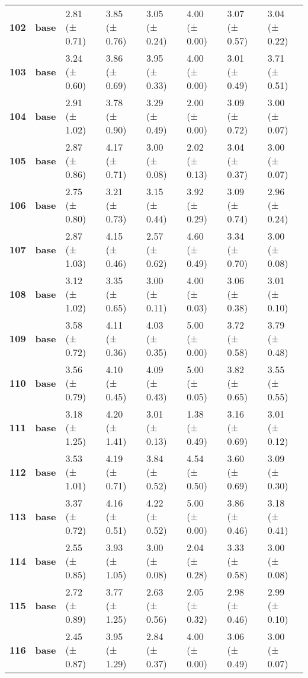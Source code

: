 \begin{longtable}{llllllll}
\cline{1-8}
\textbf{102} & \textbf{base} & 2.81 (± 0.71) & 3.85 (± 0.76) & 3.05 (± 0.24) & 4.00 (± 0.00) & 3.07 (± 0.57) & 3.04 (± 0.22) \\
\cline{1-8}
\textbf{103} & \textbf{base} & 3.24 (± 0.60) & 3.86 (± 0.69) & 3.95 (± 0.33) & 4.00 (± 0.00) & 3.01 (± 0.49) & 3.71 (± 0.51) \\
\cline{1-8}
\textbf{104} & \textbf{base} & 2.91 (± 1.02) & 3.78 (± 0.90) & 3.29 (± 0.49) & 2.00 (± 0.00) & 3.09 (± 0.72) & 3.00 (± 0.07) \\
\cline{1-8}
\textbf{105} & \textbf{base} & 2.87 (± 0.86) & 4.17 (± 0.71) & 3.00 (± 0.08) & 2.02 (± 0.13) & 3.04 (± 0.37) & 3.00 (± 0.07) \\
\cline{1-8}
\textbf{106} & \textbf{base} & 2.75 (± 0.80) & 3.21 (± 0.73) & 3.15 (± 0.44) & 3.92 (± 0.29) & 3.09 (± 0.74) & 2.96 (± 0.24) \\
\cline{1-8}
\textbf{107} & \textbf{base} & 2.87 (± 1.03) & 4.15 (± 0.46) & 2.57 (± 0.62) & 4.60 (± 0.49) & 3.34 (± 0.70) & 3.00 (± 0.08) \\
\cline{1-8}
\textbf{108} & \textbf{base} & 3.12 (± 1.02) & 3.35 (± 0.65) & 3.00 (± 0.11) & 4.00 (± 0.03) & 3.06 (± 0.38) & 3.01 (± 0.10) \\
\cline{1-8}
\textbf{109} & \textbf{base} & 3.58 (± 0.72) & 4.11 (± 0.36) & 4.03 (± 0.35) & 5.00 (± 0.00) & 3.72 (± 0.58) & 3.79 (± 0.48) \\
\cline{1-8}
\textbf{110} & \textbf{base} & 3.56 (± 0.79) & 4.10 (± 0.45) & 4.09 (± 0.43) & 5.00 (± 0.05) & 3.82 (± 0.65) & 3.55 (± 0.55) \\
\cline{1-8}
\textbf{111} & \textbf{base} & 3.18 (± 1.25) & 4.20 (± 1.41) & 3.01 (± 0.13) & 1.38 (± 0.49) & 3.16 (± 0.69) & 3.01 (± 0.12) \\
\cline{1-8}
\textbf{112} & \textbf{base} & 3.53 (± 1.01) & 4.19 (± 0.71) & 3.84 (± 0.52) & 4.54 (± 0.50) & 3.60 (± 0.69) & 3.09 (± 0.30) \\
\cline{1-8}
\textbf{113} & \textbf{base} & 3.37 (± 0.72) & 4.16 (± 0.51) & 4.22 (± 0.52) & 5.00 (± 0.00) & 3.86 (± 0.46) & 3.18 (± 0.41) \\
\cline{1-8}
\textbf{114} & \textbf{base} & 2.55 (± 0.85) & 3.93 (± 1.05) & 3.00 (± 0.08) & 2.04 (± 0.28) & 3.33 (± 0.58) & 3.00 (± 0.08) \\
\cline{1-8}
\textbf{115} & \textbf{base} & 2.72 (± 0.89) & 3.77 (± 1.25) & 2.63 (± 0.56) & 2.05 (± 0.32) & 2.98 (± 0.46) & 2.99 (± 0.10) \\
\cline{1-8}
\textbf{116} & \textbf{base} & 2.45 (± 0.87) & 3.95 (± 1.29) & 2.84 (± 0.37) & 4.00 (± 0.00) & 3.06 (± 0.49) & 3.00 (± 0.07) \\

\end{longtable}
